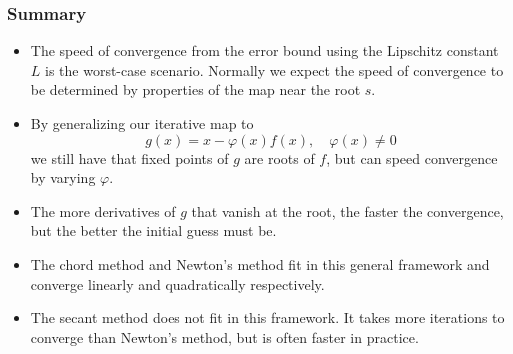 \documentclass{beamer}
\begin{document}
\begin{frame}
  \frametitle{Summary}

  \begin{itemize}
  \item The speed of convergence from the error bound using the
    Lipschitz constant $L$ is the worst-case scenario. Normally we
    expect the speed of convergence to be determined by properties of
    the map near the root $s$.
  \item By generalizing our iterative map to
    \begin{equation*}
      g(x) = x - \varphi(x) f(x), \quad \varphi(x) \neq 0
    \end{equation*}
    we still have that fixed points of $g$ are roots of $f$, but can
    speed convergence by varying $\varphi$.
  \item The more derivatives of $g$ that vanish at the root, the
    faster the convergence, but the better the initial guess must be.
  \item The chord method and Newton's method fit in this general
    framework and converge linearly and quadratically respectively.
  \item The secant method does not fit in this framework. It takes
    more iterations to converge than Newton's method, but is often
    faster in practice.
  \end{itemize}

\end{frame}
\end{document}
